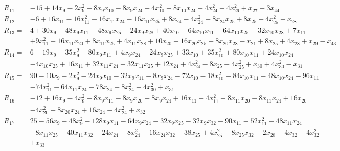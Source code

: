 \begin{align*}
R_{11}={}&-15+14x_{9}-2x_{9}^{2}-8x_{9}x_{10}-8x_{9}x_{24}+4x_{10}^{2}+8x_{10}x_{24}+4x_{24}^{2}-4x_{26}^{2}+x_{27}-3x_{44}
\end{align*}
\begin{align*}
R_{12}={}&-6+16x_{11}-16x_{11}^{2}-16x_{11}x_{24}-16x_{11}x_{25}+8x_{24}-4x_{24}^{2}-8x_{24}x_{25}+8x_{25}-4x_{25}^{2}+x_{28}
\end{align*}
\begin{align*}
R_{13}={}&4+30x_{9}-48x_{9}x_{11}-48x_{9}x_{25}-24x_{9}x_{28}+40x_{10}-64x_{10}x_{11}-64x_{10}x_{25}-32x_{10}x_{28}+7x_{11}\\
{}&+9x_{11}^{2}-16x_{11}x_{20}+8x_{11}x_{25}+4x_{11}x_{28}+10x_{20}-16x_{20}x_{25}-8x_{20}x_{28}-x_{21}+8x_{25}+4x_{28}+x_{29}-x_{43}
\end{align*}
\begin{align*}
R_{14}={}&6-19x_{9}-35x_{9}^{2}-80x_{9}x_{11}+4x_{9}x_{24}-24x_{9}x_{25}+33x_{10}+35x_{10}^{2}+80x_{10}x_{11}+24x_{10}x_{24}\\
{}&-4x_{10}x_{25}+16x_{11}+32x_{11}x_{24}-32x_{11}x_{25}+12x_{24}+4x_{24}^{2}-8x_{25}-4x_{25}^{2}+x_{30}+4x_{30}^{2}-x_{31}
\end{align*}
\begin{align*}
R_{15}={}&90-10x_{9}-2x_{9}^{2}-24x_{9}x_{10}-32x_{9}x_{11}-8x_{9}x_{24}-72x_{10}-18x_{10}^{2}-84x_{10}x_{11}-48x_{10}x_{24}-96x_{11}\\
{}&-74x_{11}^{2}-64x_{11}x_{24}-78x_{24}-8x_{24}^{2}-4x_{30}^{2}+x_{31}
\end{align*}
\begin{align*}
R_{16}={}&-12+16x_{9}-4x_{9}^{2}-8x_{9}x_{11}-8x_{9}x_{20}-8x_{9}x_{24}+16x_{11}-4x_{11}^{2}-8x_{11}x_{20}-8x_{11}x_{24}+16x_{20}\\
{}&-4x_{20}^{2}-8x_{20}x_{24}+16x_{24}-4x_{24}^{2}+x_{32}
\end{align*}
\begin{align*}
R_{17}={}&25-56x_{9}-48x_{9}^{2}-128x_{9}x_{11}-64x_{9}x_{24}-32x_{9}x_{25}-32x_{9}x_{32}-90x_{11}-52x_{11}^{2}-48x_{11}x_{24}\\
{}&-8x_{11}x_{25}-40x_{11}x_{32}-24x_{24}-8x_{24}^{2}-16x_{24}x_{32}-38x_{25}+4x_{25}^{2}-8x_{25}x_{32}-2x_{28}-4x_{32}-4x_{32}^{2}\\
{}&+x_{33}
\end{align*}
